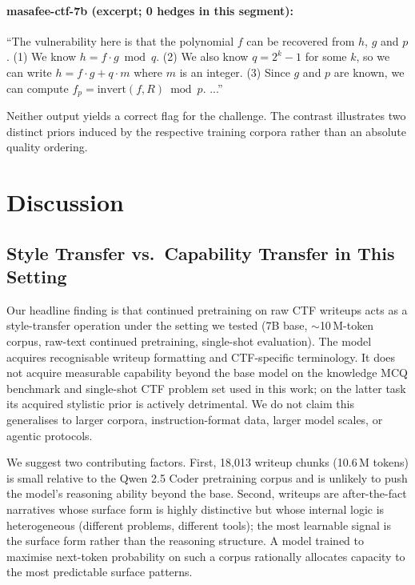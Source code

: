 \documentclass[10pt,twocolumn,a4paper]{article}
\begin{document}
\paragraph{masafee-ctf-7b (excerpt; 0 hedges in this segment):}
``The vulnerability here is that the polynomial $f$ can be recovered from $h$, $g$ and $p$. (1) We know $h = f \cdot g \bmod q$. (2) We also know $q = 2^k - 1$ for some $k$, so we can write $h = f \cdot g + q \cdot m$ where $m$ is an integer. (3) Since $g$ and $p$ are known, we can compute $f_p = \mathrm{invert}(f, R) \bmod p$. ...''

Neither output yields a correct flag for the challenge. The contrast illustrates two distinct priors induced by the respective training corpora rather than an absolute quality ordering.

\section{Discussion}

\subsection{Style Transfer vs.\ Capability Transfer in This Setting}

Our headline finding is that continued pretraining on raw CTF writeups acts as a style-transfer operation under the setting we tested (7B base, $\sim$10\,M-token corpus, raw-text continued pretraining, single-shot evaluation). The model acquires recognisable writeup formatting and CTF-specific terminology. It does not acquire measurable capability beyond the base model on the knowledge MCQ benchmark and single-shot CTF problem set used in this work; on the latter task its acquired stylistic prior is actively detrimental. We do not claim this generalises to larger corpora, instruction-format data, larger model scales, or agentic protocols.

We suggest two contributing factors. First, 18{,}013 writeup chunks (10.6\,M tokens) is small relative to the Qwen 2.5 Coder pretraining corpus and is unlikely to push the model's reasoning ability beyond the base. Second, writeups are after-the-fact narratives whose surface form is highly distinctive but whose internal logic is heterogeneous (different problems, different tools); the most learnable signal is the surface form rather than the reasoning structure. A model trained to maximise next-token probability on such a corpus rationally allocates capacity to the most predictable surface patterns.
\end{document}
